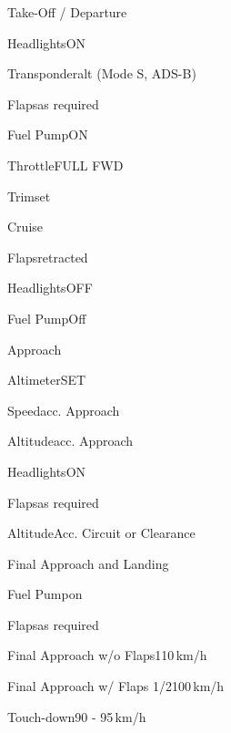 \begin{checklist}{Take-Off / Departure}
	  \item{Headlights}{ON}
	  \item{Transponder}{alt (Mode S, ADS-B)}
	  \item{Flaps}{as required}
	  \item{Fuel Pump}{ON}
	  \item{Throttle}{FULL FWD}
	\item{Trim}{set}
\end{checklist}
	
\begin{checklist}{Cruise}
	\item{Flaps}{retracted}
	\item{Headlights}{OFF}
	\item{Fuel Pump}{Off} 
	 
\end{checklist}

\begin{checklist}{Approach}
	\item{Altimeter}{SET}
	\item{Speed}{acc. Approach}
	\item{Altitude}{acc. Approach}
	\item{Headlights}{ON}
	\item{Flaps}{as required}
	\item{Altitude}{Acc. Circuit or Clearance}
\end{checklist}

\begin{checklist}{Final Approach and Landing}
	\item{Fuel Pump}{on}
	\item{Flaps}{as required}
	\item{Final Approach w/o Flaps}{110\,km/h}
	\item{Final Approach w/ Flaps 1/2}{100\,km/h}
	\item{Touch-down}{90 - 95\,km/h}
\end{checklist}

